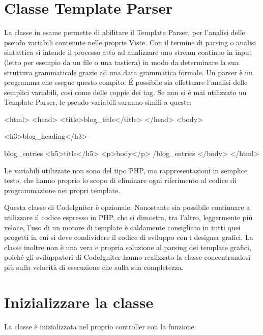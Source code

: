 \section{Classe Template Parser}
\label{class:templateparser}

La classe in esame permette di abilitare il Template Parser, per l'analisi delle pseudo variabili contenute nelle proprie Viste. Con il termine di parsing o analisi sintattica si intende il processo atto ad analizzare uno stream continuo in input (letto per esempio da un file o una tastiera) in modo da determinare la sua struttura grammaticale grazie ad una data grammatica formale. Un parser è un programma che esegue questo compito.  \'E possibile sia effettuare l'analisi delle semplici variabili, così come delle coppie dei tag. Se non si è mai utilizzato un Template Parser, le pseudo-variabili saranno simili a queste:

\begin{html}
<html>
<head>
<title>{blog_title}</title>
</head>
<body>

<h3>{blog_heading}</h3>

{blog_entries}
<h5>{title}</h5>
<p>{body}</p>
{/blog_entries}
</body>
</html>
\end{html}

Le variabili utilizzate non sono del tipo \ac{PHP}, ma rappresentazioni in semplice testo, che hanno proprio lo scopo di eliminare ogni riferimento al codice di programmazione nei propri template.

Questa classe di CodeIgniter è opzionale. Nonostante sia possibile continuare a utilizzare il codice espresso in \ac{PHP}, che si dimostra, tra l'altro, leggermente più veloce, l'uso di un motore di template è caldamente consigliato in tutti quei progetti in cui si deve condividere il codice di sviluppo con i designer grafici. La classe inoltre non è una vera e propria soluzione al parsing dei template grafici, poiché gli sviluppatori di CodeIgniter hanno realizzato la classe concentrandosi più sulla velocità di esecuzione che sulla sua completezza.

\section*{Inizializzare la classe}

La classe è inizializzata nel proprio controller con la funzione:


